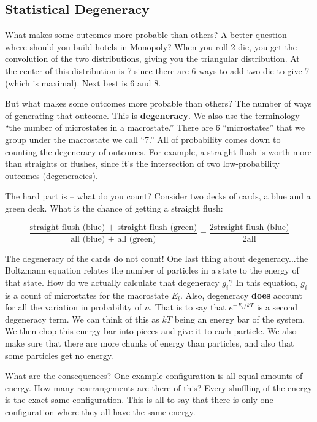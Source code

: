 \documentclass{article}
\begin{document}
\subsection{Statistical Degeneracy}

What makes some outcomes more probable than others? A better question -- where should you build hotels in Monopoly? When you roll 2 die, you get the convolution of the two distributions, giving you the triangular distribution. At the center of this distribution is 7 since there are 6 ways to add two die to give 7 (which is maximal). Next best is 6 and 8.

But what makes some outcomes more probable than others? The number of ways of generating that outcome. This is \textbf{degeneracy}. We also use the terminology ``the number of microstates in a macrostate.'' There are 6 ``microstates'' that we group under the macrostate we call ``7.'' All of probability comes down to counting the degeneracy of outcomes. For example, a straight flush is worth more than straights or flushes, since it's the intersection of two low-probability outcomes (degeneracies). 

The hard part is -- what do you count? Consider two decks of cards, a blue and a green deck. What is the chance of getting a straight flush:

\begin{equation}
    \frac{\text{straight flush (blue) + straight flush (green)}}{\text{all (blue) + all (green)}} = \frac{2\text{straight flush (blue)}}{2\text{all}} 
\end{equation}

The degeneracy of the cards do not count! One last thing about degeneracy...the Boltzmann equation relates the number of particles in a state to the energy of that state. How do we actually calculate that degeneracy $g_i$? In this equation, $g_i$ is a count of microstates for the macrostate $E_i$. Also, degeneracy \textbf{does} account for all the variation in probability of $n$. That is to say that $e^{-E_i /k T}$ is a second degeneracy term. We can think of this as $kT$ being an energy bar of the system. We then chop this energy bar into pieces and give it to each particle. We also make sure that there are more chunks of energy than particles, and also that some particles get no energy. 

What are the consequences? One example configuration is all equal amounts of energy. How many rearrangements are there of this? Every shuffling of the energy is the exact same configuration. This is all to say that there is only one configuration where they all have the same energy.
\end{document}
